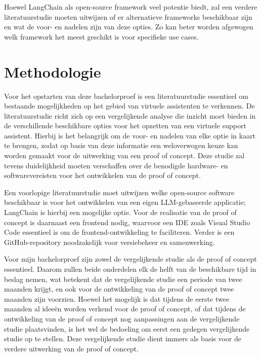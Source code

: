 Hoewel LangChain als open-source framework veel potentie biedt, zal een verdere literatuurstudie moeten uitwijzen of er alternatieve frameworks beschikbaar zijn en wat de voor- en nadelen zijn van deze opties. Zo kan beter worden afgewogen welk framework het meest geschikt is voor specifieke use cases.


\section{Methodologie}%
\label{sec:methodologie}

Voor het opstarten van deze bachelorproef is een literatuurstudie essentieel om bestaande mogelijkheden op het gebied van virtuele assistenten te verkennen. De literatuurstudie richt zich op een vergelijkende analyse die inzicht moet bieden in de verschillende beschikbare opties voor het opzetten van een virtuele support assistent. Hierbij is het belangrijk om de voor- en nadelen van elke optie in kaart te brengen, zodat op basis van deze informatie een weloverwogen keuze kan worden gemaakt voor de uitwerking van een proof of concept. Deze studie zal tevens duidelijkheid moeten verschaffen over de benodigde hardware- en softwarevereisten voor het ontwikkelen van de proof of concept.

Een voorlopige literatuurstudie moet uitwijzen welke open-source software beschikbaar is voor het ontwikkelen van een eigen LLM-gebaseerde applicatie; LangChain is hierbij een mogelijke optie. Voor de realisatie van de proof of concept is daarnaast een frontend nodig, waarvoor een IDE zoals Visual Studio Code essentieel is om de frontend-ontwikkeling te faciliteren. Verder is een GitHub-repository noodzakelijk voor versiebeheer en samenwerking.

Voor mijn bachelorproef zijn zowel de vergelijkende studie als de proof of concept essentieel. Daarom zullen beide onderdelen elk de helft van de beschikbare tijd in beslag nemen, wat betekent dat de vergelijkende studie een periode van twee maanden krijgt, en ook voor de ontwikkeling van de proof of concept twee maanden zijn voorzien. Hoewel het mogelijk is dat tijdens de eerste twee maanden al ideeën worden verkend voor de proof of concept, of dat tijdens de ontwikkeling van de proof of concept nog aanpassingen aan de vergelijkende studie plaatsvinden, is het wel de bedoeling om eerst een gedegen vergelijkende studie op te stellen. Deze vergelijkende studie dient immers als basis voor de verdere uitwerking van de proof of concept.

